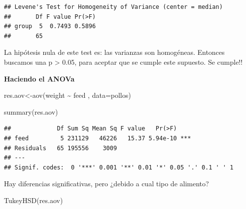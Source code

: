\documentclass[
]{book}
\newenvironment{Shaded}{\begin{snugshade}}{\end{snugshade}}
\newcommand{\AttributeTok}[1]{\textcolor[rgb]{0.77,0.63,0.00}{#1}}
\newcommand{\FunctionTok}[1]{\textcolor[rgb]{0.00,0.00,0.00}{#1}}
\newcommand{\NormalTok}[1]{#1}
\newcommand{\OtherTok}[1]{\textcolor[rgb]{0.56,0.35,0.01}{#1}}
\newcommand{\SpecialCharTok}[1]{\textcolor[rgb]{0.00,0.00,0.00}{#1}}
\begin{document}
\begin{Shaded}
\end{Shaded}

\begin{verbatim}
## Levene's Test for Homogeneity of Variance (center = median)
##       Df F value Pr(>F)
## group  5  0.7493 0.5896
##       65
\end{verbatim}

La hipótesis nula de este test es: las varianzas son homogéneas. Entonces buscamos una p \textgreater{} 0.05, para aceptar que se cumple este supuesto. Se cumple!!

\textbf{Haciendo el ANOVa}

\begin{Shaded}
\begin{Highlighting}[]
\NormalTok{res.aov}\OtherTok{\textless{}{-}}\FunctionTok{aov}\NormalTok{(weight }\SpecialCharTok{\textasciitilde{}}\NormalTok{ feed , }\AttributeTok{data=}\NormalTok{pollos)}

\FunctionTok{summary}\NormalTok{(res.aov)}
\end{Highlighting}
\end{Shaded}

\begin{verbatim}
##             Df Sum Sq Mean Sq F value   Pr(>F)    
## feed         5 231129   46226   15.37 5.94e-10 ***
## Residuals   65 195556    3009                     
## ---
## Signif. codes:  0 '***' 0.001 '**' 0.01 '*' 0.05 '.' 0.1 ' ' 1
\end{verbatim}

Hay diferencias significativas, pero ¿debido a cual tipo de alimento?

\begin{Shaded}
\begin{Highlighting}[]
\FunctionTok{TukeyHSD}\NormalTok{(res.aov)}
\end{Highlighting}
\end{Shaded}
\end{document}

